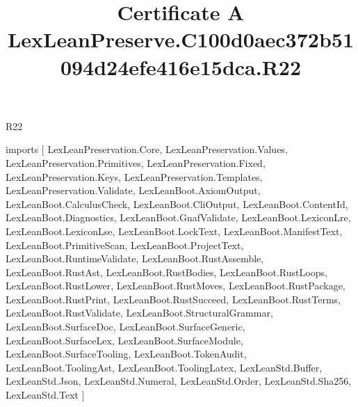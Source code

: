 \begin{lexlean}{R22}
\title{Certificate A LexLeanPreserve.C100d0aec372b51094d24efe416e15dca.R22}
\begin{coremodule}
imports [
  LexLeanPreservation.Core,
  LexLeanPreservation.Values,
  LexLeanPreservation.Primitives,
  LexLeanPreservation.Fixed,
  LexLeanPreservation.Keys,
  LexLeanPreservation.Templates,
  LexLeanPreservation.Validate,
  LexLeanBoot.AxiomOutput,
  LexLeanBoot.CalculusCheck,
  LexLeanBoot.CliOutput,
  LexLeanBoot.ContentId,
  LexLeanBoot.Diagnostics,
  LexLeanBoot.GnafValidate,
  LexLeanBoot.LexiconLre,
  LexLeanBoot.LexiconLse,
  LexLeanBoot.LockText,
  LexLeanBoot.ManifestText,
  LexLeanBoot.PrimitiveScan,
  LexLeanBoot.ProjectText,
  LexLeanBoot.RuntimeValidate,
  LexLeanBoot.RustAssemble,
  LexLeanBoot.RustAst,
  LexLeanBoot.RustBodies,
  LexLeanBoot.RustLoops,
  LexLeanBoot.RustLower,
  LexLeanBoot.RustMoves,
  LexLeanBoot.RustPackage,
  LexLeanBoot.RustPrint,
  LexLeanBoot.RustSucceed,
  LexLeanBoot.RustTerms,
  LexLeanBoot.RustValidate,
  LexLeanBoot.StructuralGrammar,
  LexLeanBoot.SurfaceDoc,
  LexLeanBoot.SurfaceGeneric,
  LexLeanBoot.SurfaceLex,
  LexLeanBoot.SurfaceModule,
  LexLeanBoot.SurfaceTooling,
  LexLeanBoot.TokenAudit,
  LexLeanBoot.ToolingAst,
  LexLeanBoot.ToolingLatex,
  LexLeanStd.Buffer,
  LexLeanStd.Json,
  LexLeanStd.Numeral,
  LexLeanStd.Order,
  LexLeanStd.Sha256,
  LexLeanStd.Text
]


\end{coremodule}
\end{lexlean}
